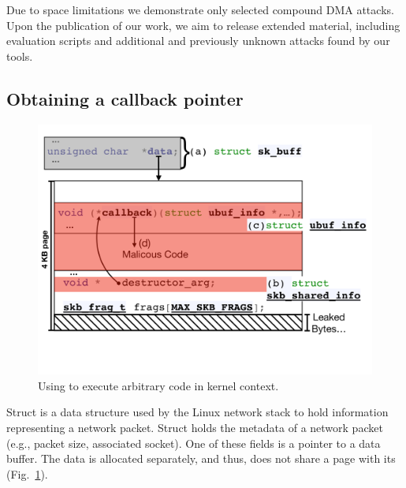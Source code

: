 Due to space limitations we demonstrate only selected compound DMA attacks. 
Upon the publication of our work, we aim to release extended material, including evaluation scripts and additional \compound and previously unknown \simple attacks found by our tools.

\subsection{Obtaining a callback pointer}\label{sec:shinfo_exploit}
\begin{figure}[t]
    \centering
    \includegraphics[width=0.8\linewidth]{figs/ubuf.pdf}
    \caption{Using \shinfo{} to execute arbitrary code in kernel context.}
    \label{fig:sh_info}
    \vspace{-4mm}
\end{figure}

Struct \skb{} is a data structure used by the Linux network stack to hold information representing a network packet. Struct \skb{} holds the metadata of a network packet (e.g., packet size, associated socket). One of these fields is a pointer to a data buffer. The data is allocated separately, and thus, does not share a page with its \skb{} (Fig.~\ref{fig:sh_info}). 

